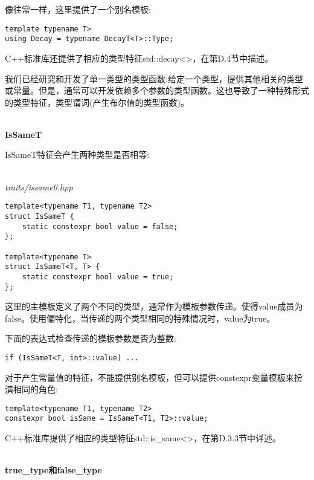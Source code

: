 像往常一样，这里提供了一个别名模板:

\begin{lstlisting}[style=styleCXX]
template typename T>
using Decay = typename DecayT<T>::Type;
\end{lstlisting}

C++标准库还提供了相应的类型特征std::decay<>，在第D.4节中描述。


我们已经研究和开发了单一类型的类型函数:给定一个类型，提供其他相关的类型或常量。但是，通常可以开发依赖多个参数的类型函数。这也导致了一种特殊形式的类型特征，类型谓词(产生布尔值的类型函数)。

\hspace*{\fill} \\ %
\noindent
\textbf{IsSameT}

IsSameT特征会产生两种类型是否相等:

\hspace*{\fill} \\ %
\noindent
\textit{traits/issame0.hpp}
\begin{lstlisting}[style=styleCXX]
template<typename T1, typename T2>
struct IsSameT {
	static constexpr bool value = false;
};

template<typename T>
struct IsSameT<T, T> {
	static constexpr bool value = true;
};
\end{lstlisting}

这里的主模板定义了两个不同的类型，通常作为模板参数传递。使得value成员为false。使用偏特化，当传递的两个类型相同的特殊情况时，value为true。

下面的表达式检查传递的模板参数是否为整数:

\begin{lstlisting}[style=styleCXX]
if (IsSameT<T, int>::value) ...
\end{lstlisting}

对于产生常量值的特征，不能提供别名模板，但可以提供constexpr变量模板来扮演相同的角色:

\begin{lstlisting}[style=styleCXX]
template<typename T1, typename T2>
constexpr bool isSame = IsSameT<T1, T2>::value;
\end{lstlisting}

C++标准库提供了相应的类型特征std::is\_same<>，在第D.3.3节中详述。

\hspace*{\fill} \\ %
\noindent
\textbf{true\_type和false\_type}

